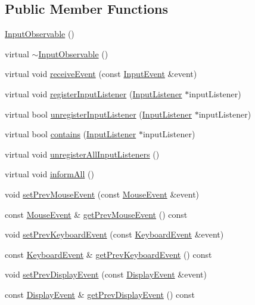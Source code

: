 \subsection*{Public Member Functions}
\begin{DoxyCompactItemize}
\item 
\mbox{\hyperlink{classec_1_1_input_observable_a92422814189d1210f631f4d1378877f3}{Input\+Observable}} ()
\item 
virtual \mbox{\hyperlink{classec_1_1_input_observable_ac261f6a73cfdcd37c276e732cc25f869}{$\sim$\+Input\+Observable}} ()
\item 
virtual void \mbox{\hyperlink{classec_1_1_input_observable_ac35d29f643a2735e4cb38cb6ee1354aa}{receive\+Event}} (const \mbox{\hyperlink{structec_1_1_input_event}{Input\+Event}} \&event)
\item 
virtual void \mbox{\hyperlink{classec_1_1_input_observable_a542bd14ecfbeceed917ea0df5c7f3755}{register\+Input\+Listener}} (\mbox{\hyperlink{classec_1_1_input_listener}{Input\+Listener}} $\ast$input\+Listener)
\item 
virtual bool \mbox{\hyperlink{classec_1_1_input_observable_aab1af4952f6127781eade6dccf33aafb}{unregister\+Input\+Listener}} (\mbox{\hyperlink{classec_1_1_input_listener}{Input\+Listener}} $\ast$input\+Listener)
\item 
virtual bool \mbox{\hyperlink{classec_1_1_input_observable_a6e14f68359b8d7e1be60e8503a07ea87}{contains}} (\mbox{\hyperlink{classec_1_1_input_listener}{Input\+Listener}} $\ast$input\+Listener)
\item 
virtual void \mbox{\hyperlink{classec_1_1_input_observable_ac8d3ed43a3b26601e2710e3758248620}{unregister\+All\+Input\+Listeners}} ()
\item 
virtual void \mbox{\hyperlink{classec_1_1_input_observable_ac8ac61eaebb95010e8a12bb1e6348391}{inform\+All}} ()
\item 
void \mbox{\hyperlink{classec_1_1_input_observable_acf16d74cb1f51ee631e017280fff8052}{set\+Prev\+Mouse\+Event}} (const \mbox{\hyperlink{structec_1_1_mouse_event}{Mouse\+Event}} \&event)
\item 
const \mbox{\hyperlink{structec_1_1_mouse_event}{Mouse\+Event}} \& \mbox{\hyperlink{classec_1_1_input_observable_abf9f1388171a99581a0a4100bbf2d11b}{get\+Prev\+Mouse\+Event}} () const
\item 
void \mbox{\hyperlink{classec_1_1_input_observable_afcc8abf8d747417f50465189e632d0dd}{set\+Prev\+Keyboard\+Event}} (const \mbox{\hyperlink{structec_1_1_keyboard_event}{Keyboard\+Event}} \&event)
\item 
const \mbox{\hyperlink{structec_1_1_keyboard_event}{Keyboard\+Event}} \& \mbox{\hyperlink{classec_1_1_input_observable_ab1ba2fa8deaf1d69a4809e4d8dc61452}{get\+Prev\+Keyboard\+Event}} () const
\item 
void \mbox{\hyperlink{classec_1_1_input_observable_a55c7310a50dc873f69c2246bbeeed3e6}{set\+Prev\+Display\+Event}} (const \mbox{\hyperlink{structec_1_1_display_event}{Display\+Event}} \&event)
\item 
const \mbox{\hyperlink{structec_1_1_display_event}{Display\+Event}} \& \mbox{\hyperlink{classec_1_1_input_observable_ac12e711d3a7dcaf65d2028d2283c1243}{get\+Prev\+Display\+Event}} () const
\end{DoxyCompactItemize}
